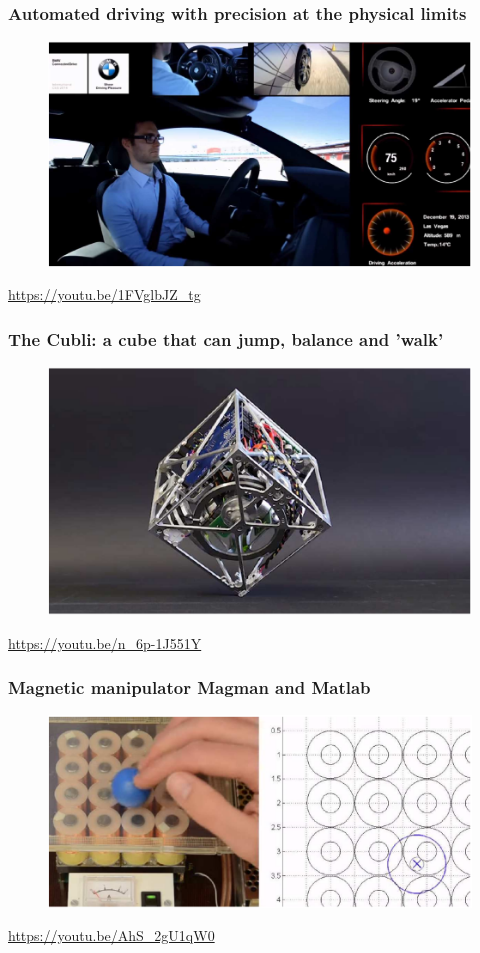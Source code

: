 \documentclass{beamer}
\begin{document}
\begin{frame}
\frametitle{Automated driving with precision at the physical limits}
\begin{figure}
\includegraphics[scale=.6]{autonomous_car}
\end{figure}
\url{https://youtu.be/1FVglbJZ_tg}
\end{frame}


\begin{frame}
\frametitle{The Cubli: a cube that can jump, balance and 'walk'}
\begin{figure}
\includegraphics[scale=.55]{cubli}
\end{figure}
\url{https://youtu.be/n_6p-1J551Y}
\end{frame}


\begin{frame}
\frametitle{Magnetic manipulator Magman and Matlab}
\begin{figure}
\includegraphics[scale=.65]{magnetic_manipulator}
\end{figure}
\url{https://youtu.be/AhS_2gU1qW0}
\end{frame}
\end{document}
